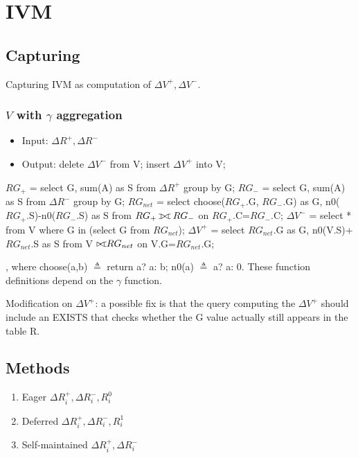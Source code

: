 \documentclass[a4paper]{report}
\def\ojoin{\setbox0=\hbox{$\bowtie$}%
  \rule[-.02ex]{.25em}{.4pt}\llap{\rule[\ht0]{.25em}{.4pt}}}
\def\rightouterjoin{\mathbin{\bowtie\mkern-5.8mu\ojoin}}
\def\fullouterjoin{\mathbin{\ojoin\mkern-5.8mu\bowtie\mkern-5.8mu\ojoin}}
\begin{document}
\section{IVM}
\subsection{Capturing}
Capturing IVM as computation of $\Delta V^+, \Delta V^-$.

\subsubsection{$V$ with $\gamma$ aggregation}
\begin{itemize}
\item Input: $\Delta R^+, \Delta R^-$
\item Output: delete $\Delta V^-$ from V; insert $\Delta V^+$ into V;
\end{itemize}

\begin{pseudo}
$RG_+$ = select G, sum(A) as S from $\Delta R^+$ group by G;
$RG_-$ = select G, sum(A) as S from $\Delta R^-$ group by G;
$RG_{net}$ = select choose($RG_+$.G, $RG_-$.G) as G, n0($RG_+$.S)-n0($RG_-$.S) as S
         from $RG_+ \fullouterjoin RG_-$ on $RG_+$.C=$RG_-$.C;
$\Delta V^-$ = select * from V where G in (select G from $RG_{net}$);
$\Delta V^+$ = select $RG_{net}$.G as G, n0(V.S)+$RG_{net}$.S as S
        from V $\rightouterjoin RG_{net}$ on V.G=$RG_{net}$.G;
\end{pseudo}

, where choose(a,b) $\triangleq$ return a? a: b; n0(a) $\triangleq$ a? a: 0. These function definitions depend on the $\gamma$ function.

Modification on $\Delta V^+$: a possible fix is that the query computing the $\Delta V^+$ should include an EXISTS that checks whether the G value actually still appears in the table R.

\subsection{Methods}
\begin{enumerate}
\item Eager $\Delta R_i^+, \Delta R_i^-, R_i^0$
\item Deferred $\Delta R_i^+, \Delta R_i^-, R_i^1$
\item Self-maintained $\Delta R_i^+, \Delta R_i^-$
\end{enumerate}
\end{document}
